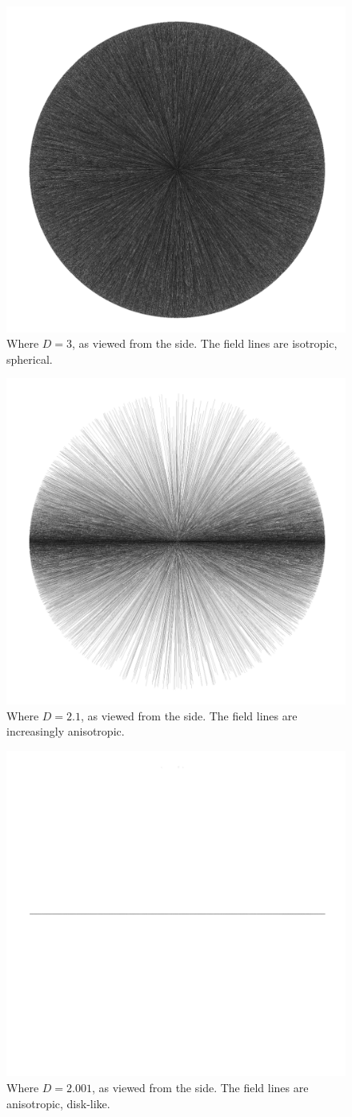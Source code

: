 \documentclass[12pt]{article}
\begin{document}
\begin{figure} 
\centering
\label{fig2}
  \includegraphics[width = 3 in]{3.png}
  \caption{
Where $D = 3$, as viewed from the side.
The field lines are isotropic, spherical.
}
\end{figure}

\begin{figure} 
\centering
\label{fig3}
  \includegraphics[width = 3 in]{2.1.png}
  \caption{
Where $D = 2.1$, as viewed from the side.
The field lines are increasingly anisotropic.
}
\end{figure}

\begin{figure} 
\centering
\label{fig4}
  \includegraphics[width = 3 in]{2.001.png}
  \caption{
Where $D = 2.001$, as viewed from the side.
The field lines are anisotropic, disk-like.
}
\end{figure}
\end{document}
